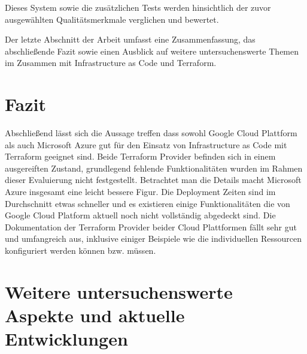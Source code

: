 \begin{spacing}{1.2}
Dieses System sowie die zusätzlichen Tests werden hinsichtlich der zuvor
ausgewählten Qualitätsmerkmale verglichen und bewertet.

Der letzte Abschnitt der Arbeit umfasst eine Zusammenfassung, 
das abschließende Fazit sowie einen Ausblick auf weitere
untersuchenswerte Themen im Zusammen mit Infrastructure as Code
und Terraform. 

\section{Fazit}

Abschließend lässt sich die Aussage treffen dass sowohl Google Cloud
Plattform als auch Microsoft Azure gut für den Einsatz von Infrastructure
as Code mit Terraform geeignet sind. Beide Terraform Provider befinden
sich in einem ausgereiften Zustand, grundlegend fehlende
Funktionalitäten wurden im Rahmen dieser Evaluierung nicht festgestellt.
Betrachtet man die Details macht Microsoft Azure insgesamt eine
leicht bessere Figur. Die Deployment Zeiten sind im Durchschnitt
etwas schneller und es existieren einige Funktionalitäten die von
Google Cloud Platform aktuell noch nicht vollständig abgedeckt sind.
Die Dokumentation der Terraform Provider beider Cloud Plattformen
fällt sehr gut und umfangreich aus, inklusive einiger Beispiele wie
die individuellen Ressourcen konfiguriert werden können bzw. müssen.

\section{Weitere untersuchenswerte Aspekte und aktuelle Entwicklungen}


\end{spacing}
